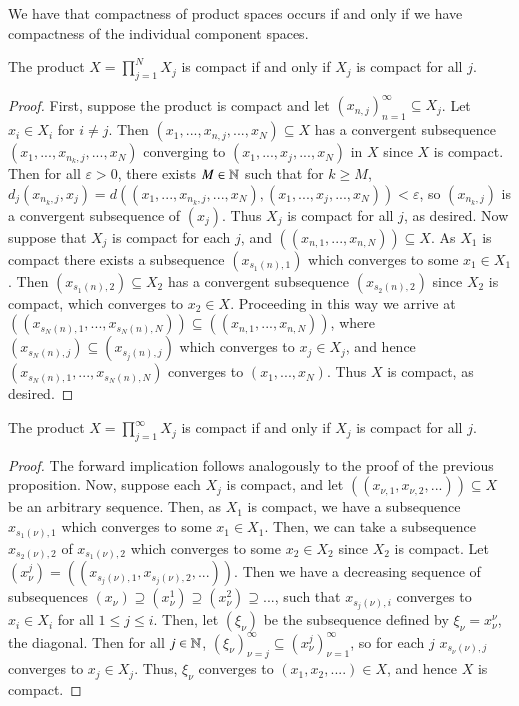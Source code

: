 We have that compactness of product spaces occurs if and only if we have compactness of the individual component spaces.

\begin{prop}
    The product $X = \prod_{j=1}^NX_j$ is compact if and only if $X_j$ is compact for all $j$.
\end{prop}
\begin{proof}
    First, suppose the product is compact and let $(x_{n,j})_{n=1}^{\infty} \subseteq X_j$. Let $x_i \in X_i$ for $i \neq j$. Then $(x_1,...,x_{n,j},...,x_N) \subseteq X$ has a convergent subsequence $(x_1,...,x_{n_k,j},...,x_N)$ converging to $(x_1,...,x_j,...,x_N)$ in $X$ since $X$ is compact. Then for all $\varepsilon > 0$, there exists $M \in \mathbb N$ such that for $k \geq M$, $d_j(x_{n_k,j},x_j) = d((x_1,...,x_{n_k,j},...,x_N),(x_1,...,x_j,...,x_N)) < \varepsilon$, so $(x_{n_k,j})$ is a convergent subsequence of $(x_j)$. Thus $X_j$ is compact for all $j$, as desired. Now suppose that $X_j$ is compact for each $j$, and $((x_{n,1},...,x_{n,N})) \subseteq X$. As $X_1$ is compact there exists a subsequence $(x_{s_1(n),1})$ which converges to some $x_1 \in X_1$. Then $(x_{s_1(n),2}) \subseteq X_2$ has a convergent subsequence $(x_{s_2(n),2})$ since $X_2$ is compact, which converges to $x_2 \in X$. Proceeding in this way we arrive at $((x_{s_N(n),1},...,x_{s_N(n),N})) \subseteq ((x_{n,1},...,x_{n,N}))$, where $(x_{s_N(n),j}) \subseteq (x_{s_j(n),j})$ which converges to $x_j \in X_j$, and hence $(x_{s_N(n),1},...,x_{s_N(n),N})$ converges to $(x_1,...,x_N)$. Thus $X$ is compact, as desired.
\end{proof}

\begin{prop}
    The product $X = \prod_{j=1}^{\infty}X_j$ is compact if and only if $X_j$ is compact for all $j$.
\end{prop}
\begin{proof}
    The forward implication follows analogously to the proof of the previous proposition. Now, suppose each $X_j$ is compact, and let $((x_{\nu,1},x_{\nu,2},...)) \subseteq X$ be an arbitrary sequence. Then, as $X_1$ is compact, we have a subsequence $x_{s_1(\nu),1}$ which converges to some $x_1 \in X_1$. Then, we can take a subsequence $x_{s_2(\nu),2}$ of $x_{s_1(\nu),2}$ which converges to some $x_2 \in X_2$ since $X_2$ is compact. Let $(x^j_{\nu}) = ((x_{s_j(\nu),1},x_{s_j(\nu),2},...))$. Then we have a decreasing sequence of subsequences $(x_{\nu}) \supseteq (x^1_{\nu}) \supseteq (x^2_{\nu}) \supseteq ...$, such that $x_{s_j(\nu),i}$ converges to $x_i \in X_i$ for all $1 \leq j \leq i$. Then, let $(\xi_{\nu})$ be the subsequence defined by $\xi_{\nu} = x^{\nu}_{\nu}$, the diagonal. Then for all $j \in \mathbb N$, $(\xi_{\nu})_{\nu=j}^{\infty} \subseteq (x^j_{\nu})_{\nu=1}^{\infty}$, so for each $j$ $x_{s_{\nu}(\nu),j}$ converges to $x_j \in X_j$. Thus, $\xi_{\nu}$ converges to $(x_1,x_2,....) \in X$, and hence $X$ is compact.
\end{proof}


